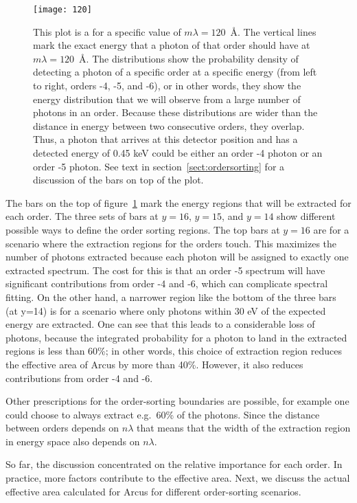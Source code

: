 \documentclass[12pt]{spieman}  %
\begin{document}
\begin{spacing}{2}
\begin{figure}
    \centering
    \texttt{[image: 120]}
    \caption {\label{fig:120}
    This plot is a for a specific value of $m\lambda=120$~\AA{}. The vertical lines mark the exact energy that a photon of that order should have at $m\lambda=120$~\AA{}. The distributions show the probability density of detecting a photon of a specific order at a specific energy (from left to right, orders -4, -5, and -6), or in other words, they show the energy distribution that we will observe from a large number of photons in an order. Because these distributions are wider than the distance in energy between two consecutive orders, they overlap. Thus, a photon that arrives at this detector position and has a detected energy of 0.45 keV could be either an order -4 photon or an order -5 photon. See text in section~\ref{sect:ordersorting} for a discussion of the bars on top of the plot.
}
\end{figure}

The bars on the top of figure~\ref{fig:120} mark the energy regions that will be extracted for each order. The three sets of bars at $y=16$, $y=15$, and $y=14$ show different possible ways to define the order sorting regions. The top bars at $y=16$ are for a scenario where the extraction regions for the orders touch. This maximizes the number of photons extracted because each photon will be assigned to exactly one extracted spectrum. The cost for this is that an order -5 spectrum will have significant contributions from order -4 and -6, which can complicate spectral fitting.
On the other hand, a narrower region like the bottom of the three bars (at y=14) is for a scenario where only photons within 30 eV of the expected energy are extracted. One can see that this leads to a considerable loss of photons, because the integrated probability for a photon to land in the extracted regions is less than 60\%; in other words, this choice of extraction region reduces the effective area of Arcus by more than 40\%. However, it also reduces contributions from order -4 and -6.

Other prescriptions for the order-sorting boundaries are possible, for example one could choose to always extract e.g.\ 60\% of the photons. Since the distance between orders depends on $n\lambda$ that means that the width of the extraction region in energy space also depends on $n\lambda$.

So far, the discussion concentrated on the relative importance for each order. In practice, more factors contribute to the effective area. Next, we discuss the actual effective area calculated for Arcus for different order-sorting scenarios.


\end{spacing}
\end{document}

